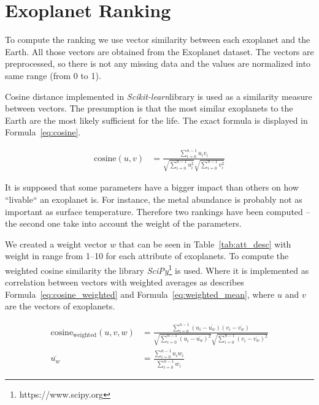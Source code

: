 \documentclass[12p]{article}
\begin{document}

\section{Exoplanet Ranking}
To compute the ranking we use vector similarity between each exoplanet and the Earth. All those vectors are obtained from the Exoplanet dataset. The vectors are preprocessed, so there is not any missing data and the values are normalized into same range (from 0 to 1).

Cosine distance implemented in \textit{Scikit-learn}\footnotemark[\value{footnote}] library is used as a similarity measure between vectors. The presumption is that the most similar exoplanets to the Earth are the most likely sufficient for the life. The exact formula is displayed in Formula~\ref{eq:cosine}.

\begin{align}
    \text{cosine}(u,v) &= \frac{\sum_{i=0}^{n-1} u_iv_i  }{ \sqrt{\sum_{i=0}^{n-1} u_i^2  } \sqrt{\sum_{i=0}^{n-1} v_i^2  }} \label{eq:cosine}
\end{align}

It is supposed that some parameters have a bigger impact than others on how ``livable`` an exoplanet is. For instance, the metal abundance is probably not as important as surface temperature. Therefore two rankings have been computed -- the second one take into account the weight of the parameters.

We created a weight vector $w$ that can be seen in Table~\ref{tab:att_desc} with weight in range from 1--10 for each attribute of exoplanets. To compute the weighted cosine similarity the library \textit{SciPy}\footnote{https://www.scipy.org} is used. Where it is implemented as correlation between vectors with weighted averages as describes Formula~\ref{eq:cosine_weighted} and Formula~\ref{eq:weighted_mean}, where $u$ and $v$ are the vectors of exoplanets.

\begin{align}
\text{cosine}_{\text{weighted}}(u,v,w) &= \frac{\sum_{i=0}^{n-1} (u_i-\overline{u_w})(v_i-\overline{v_w})  }{ \sqrt{\sum_{i=0}^{n-1} (u_i-\overline{u_w})^2  } \sqrt{\sum_{i=0}^{n-1} (v_i-\overline{v_w})^2  }} \label{eq:cosine_weighted} \\
\overline{u_w} &= \frac{ \sum_{i=0}^{n-1} u_iw_i }{ \sum_{i=0}^{n-1} w_i } \label{eq:weighted_mean}
\end{align}
\end{document}
